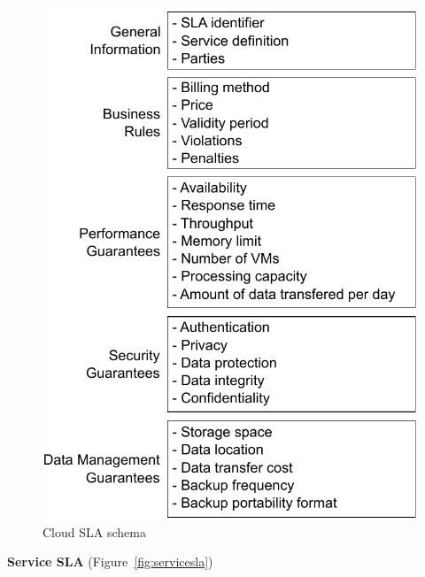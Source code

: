 \documentclass[12pt,a4paper,oneside]{article}
\begin{document}
\begin{figure}[h!]
\center
\includegraphics[scale=1]{figures/Cloud-SLA-Schema.pdf}\caption{Cloud SLA schema}\label{fig:cloudsla}
\end{figure}

\begin{flushleft}
\textbf{Service SLA} (Figure~\ref{fig:servicesla})
\end{flushleft}
\end{document}
